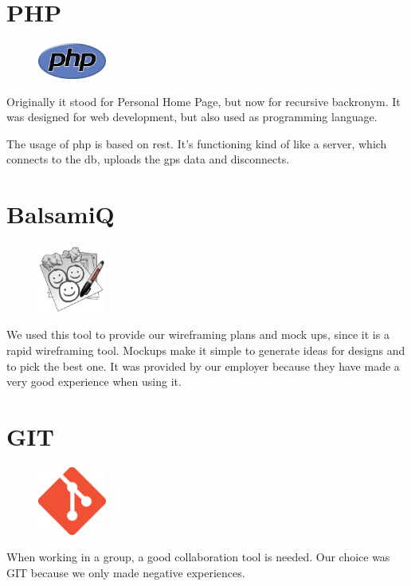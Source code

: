 \section{PHP}
\begin{figure}
  \begin{center}
    \includegraphics[width=0.2\textwidth] {bilder/php}
  \end{center}
\end{figure}
Originally it stood for Personal Home Page, but now for recursive backronym. It was designed for web development, but also used as programming language.

The usage of \gls{php} is based on \gls{rest}. It's functioning kind of like a server, which connects to the \gls{db}, uploads the \gls{gps} data and disconnects.
\section{BalsamiQ}
\begin{figure}
  \begin{center}
    \includegraphics[width=0.2\textwidth] {bilder/balsamiq}
  \end{center}
\end{figure}
We used this tool to provide our wireframing plans and mock ups, since it is a rapid wireframing tool. Mockups make it simple to generate ideas for designs and to pick the best one. It was provided by our employer because they have made a very good experience when using it.
\section{GIT}
\begin{figure}
  \begin{center}
    \includegraphics[width=0.2\textwidth] {bilder/git}
  \end{center}
\end{figure}
When working in a group, a good collaboration tool is needed. Our choice was GIT because we only made negative experiences.

